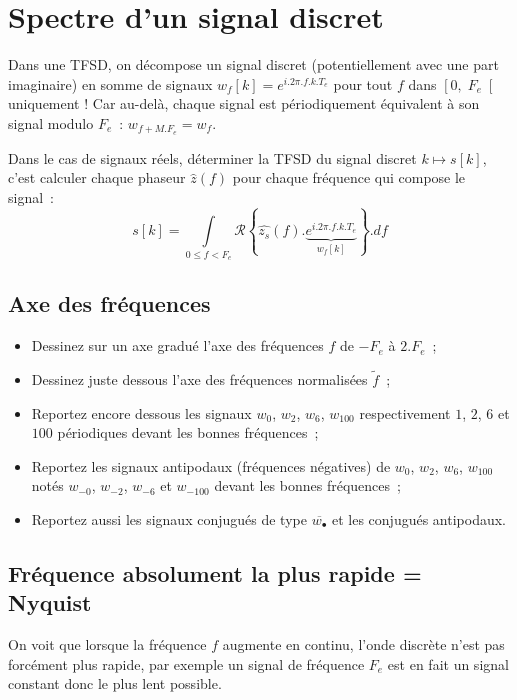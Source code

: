\documentclass[a4paper,twoside,12pt]{report}           %
\begin{document}
\section{Spectre d'un signal discret}
 
Dans une TFSD, on décompose un signal discret (potentiellement avec
une part imaginaire) en somme de signaux $w_f[k]=e^{i.2\pi.f.k.T_e}$
pour tout $f$ dans $\left[0,\; F_e \right[$ uniquement ! Car au-delà,
chaque signal est périodiquement équivalent à son signal modulo
$F_e$~: $w_{f+M.F_e}=w_f$.

Dans le cas de signaux réels, déterminer la TFSD du signal discret
$ k \mapsto s[k]$, c'est calculer chaque phaseur $\hat{z}(f)$ pour
chaque fréquence qui compose le signal~:
\begin{equation}
  \label{eq:tfsd_decompo}
  s[k] = \int\limits_{0\leq f < F_e}{\mathcal{R}\left\{\widehat{z_s}(f).\underbrace{e^{i.2\pi.f.k.T_e}}_{w_f[k]}\right\}.df}
\end{equation}

\subsection{Axe des fréquences}

\begin{itemize}
\item Dessinez sur un axe gradué l'axe des fréquences $f$ de $-F_e$ à
  $2.F_e$~;
\item Dessinez juste dessous l'axe des fréquences normalisées
  $\widetilde{f}$~;
\item Reportez encore dessous les signaux $w_0$, $w_2$, $w_6$,
  $w_{100}$ respectivement $1$, $2$, $6$ et $100$ périodiques devant
  les bonnes fréquences~;
\item Reportez les signaux antipodaux (fréquences négatives) de $w_0$,
  $w_2$, $w_6$, $w_{100}$ notés $w_{-0}$, $w_{-2}$, $w_{-6}$ et
  $w_{-100}$ devant les bonnes fréquences~;
\item Reportez aussi les signaux conjugués de type
  $\overline{w_\bullet}$ et les conjugués antipodaux.
\end{itemize}
 

 \subsection{Fréquence absolument la plus rapide = Nyquist}
 On voit que lorsque la fréquence $f$ augmente en continu, l'onde
 discrète n'est pas forcément plus rapide, par exemple un signal de
 fréquence $F_e$ est en fait un signal constant donc le plus lent
 possible.
\end{document}
